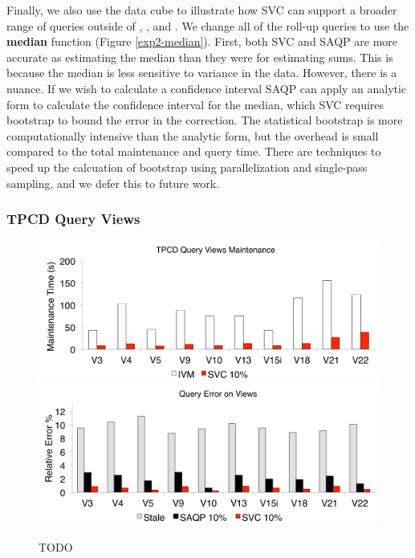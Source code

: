 Finally, we also use the data cube to illustrate how SVC can support a broader range of queries outside of \sumfunc, \countfunc, and \avgfunc.
We change all of the roll-up queries to use the \textbf{median} function (Figure \ref{exp2-median}).
First, both SVC and SAQP are more accurate as estimating the median than they were for estimating sums. 
This is because the median is less sensitive to variance in the data.
However, there is a nuance.
If we wish to calculate a confidence interval SAQP can apply an analytic form to calculate the confidence interval for the median, which SVC requires bootstrap to bound the error in the correction.
The statistical bootstrap is more computationally intensive than the analytic form, but the overhead is small compared to the total maintenance and query time.
There are techniques to speed up the calcuation of bootstrap using parallelization and single-pass sampling, and we defer this to future work.

\subsubsection{TPCD Query Views}

\begin{figure}[t]
\centering
 \includegraphics[scale=0.16]{exp/msqv_1.pdf}
 \includegraphics[scale=0.16]{exp/msqv_2.pdf}

 \caption{TODO \label{exp3-acc}}
\end{figure}

